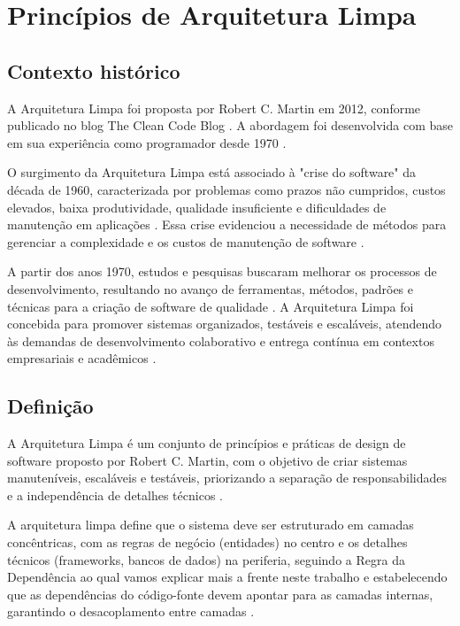 \section{Princípios de Arquitetura Limpa}
    \subsection{Contexto histórico}
        \par A Arquitetura Limpa foi proposta por Robert C. Martin em 2012, conforme publicado no blog The Clean Code Blog \cite{artigo:ferreira:2022}. A abordagem foi desenvolvida com base em sua experiência como programador desde 1970 \cite{livro:martin:cleanarch}.
        
        \par O surgimento da Arquitetura Limpa está associado à "crise do software" da década de 1960, caracterizada por problemas como prazos não cumpridos, custos elevados, baixa produtividade, qualidade insuficiente e dificuldades de manutenção em aplicações \cite{artigo:dantas:2021, artigo:ferreira:2022}. Essa crise evidenciou a necessidade de métodos para gerenciar a complexidade e os custos de manutenção de software \cite{livro:martin:cleanarch}.

        \par A partir dos anos 1970, estudos e pesquisas buscaram melhorar os processos de desenvolvimento, resultando no avanço de ferramentas, métodos, padrões e técnicas para a criação de software de qualidade \cite{artigo:dantas:2021}. A Arquitetura Limpa foi concebida para promover sistemas organizados, testáveis e escaláveis, atendendo às demandas de desenvolvimento colaborativo e entrega contínua em contextos empresariais e acadêmicos \cite{artigo:ferreira:2022}.
        
    \subsection{Definição}

        \par A Arquitetura Limpa é um conjunto de princípios e práticas de design de software proposto por Robert C. Martin, com o objetivo de criar sistemas manuteníveis, escaláveis e testáveis, priorizando a separação de responsabilidades e a independência de detalhes técnicos \cite{livro:martin:cleanarch}.

        \par A arquitetura limpa define que o sistema deve ser estruturado em camadas concêntricas, com as regras de negócio (entidades) no centro e os detalhes técnicos (frameworks, bancos de dados) na periferia, seguindo a Regra da Dependência ao qual vamos explicar mais a frente neste trabalho e estabelecendo que as dependências do código-fonte devem apontar para as camadas internas, garantindo o desacoplamento entre camadas \cite{livro:martin:cleanarch}.

